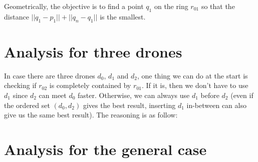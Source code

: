 \documentclass[]{article}
\begin{document}
Geometrically, the objective is to find a point $q_1$ on the ring $r_{01}$ so that the distance $||q_1-p_1|| + ||q_n-q_1||$ is the smallest.

\section{Analysis for three drones}

In case there are three drones $d_0$, $d_1$ and $d_2$, one thing we can do at the start is checking if $r_{02}$ is completely contained by $r_{01}$. If it is, then we don't have to use $d_1$ since $d_2$ can meet $d_0$ faster. Otherwise, we can always use $d_1$ before $d_2$ (even if the ordered set $(d_0, d_2)$ gives the best result, inserting $d_1$ in-between can also give us the same best result). The reasoning is as follow:



\section{Analysis for the general case}
\end{document}
